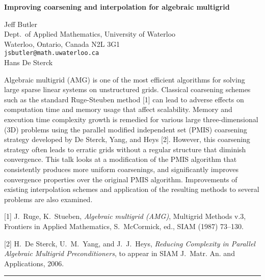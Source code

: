 \documentclass[twosided]{report}
\begin{document}
\begin{center}
{\large			%
{\bf Improving coarsening and interpolation for algebraic multigrid}}

	Jeff Butler \\
	Dept.~of Applied Mathematics, University of Waterloo \\
	Waterloo, Ontario, Canada N2L 3G1 \\
	{\tt jsbutler@math.uwaterloo.ca} \\
	Hans De Sterck
\end{center}
Algebraic multigrid (AMG) is one of the most efficient
algorithms for solving large sparse linear systems on
unstructured grids. Classical coarsening schemes such as the
standard Ruge-Steuben method [1] can lead to adverse effects
on computation time and memory usage that affect
scalability. Memory and execution time complexity growth is
remedied for various large three-dimensional (3D) problems
using the parallel modified independent set (PMIS)
coarsening strategy developed by De Sterck, Yang, and Heys
[2]. However, this coarsening strategy often leads to
erratic grids without a regular structure that diminish
convergence. This talk looks at a modification of the PMIS
algorithm that consistently produces more uniform
coarsenings, and significantly improves convergence
properties over the original PMIS algorithm. Improvements of
existing interpolation schemes and application of the
resulting methods to several problems are also examined.

[1] J.~Ruge, K.~Stueben, {\em Algebraic multigrid (AMG)},
Multigrid Methods v.3, Frontiers in Applied Mathematics,
S.~McCormick, ed., SIAM (1987) 73--130.

[2] H.~De Sterck, U.~M.~Yang, and J.~J.~Heys,
{\em Reducing Complexity in Parallel Algebraic
Multigrid Preconditioners}, to appear in
SIAM J.~Matr. An. and Applications, 2006.



	\begin{center} \rule{6in}{1pt} \end{center}
\end{document}
